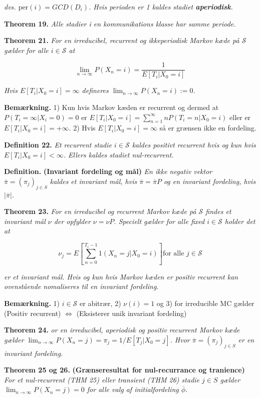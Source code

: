\documentclass[a4paper,12pt,openany]{book}
\begin{document}
\emph{dvs. \(\text{per}(i)=GCD(D_i)\). Hvis perioden er 1 kaldes stadiet \textbf{aperiodisk}.}

\textbf{Theorem 19.} \emph{Alle stadier i en kommunikations klasse har samme periode.}

\textbf{Theorem 21.} \emph{For en irreducibel, recurrent og ikkeperiodisk Markov kæde på \(\mathcal{S}\) gælder for alle \(i\in\mathcal{S}\) at}

\[
\lim_{n\to\infty}P(X_n=i)=\frac{1}{E[T_i \vert X_0=i]}
\]

\emph{Hvis \(E[T_i \vert X_0=i]=\infty\) defineres \(\lim_{n\to\infty}P(X_n=i):=0\).}

\textbf{Bemærkning.} 1) Kun hvis Markov kæden er recurrent og dermed at \(P(T_i=\infty \vert X_i=0)=0\) er \(E[T_i \vert X_0=i]=\sum_{n=1}^\infty nP(T_i=n\vert X_0=i)\) eller er \(E[T_i \vert X_0=i]=+\infty\). 2) Hvis \(E[T_i \vert X_0=i]=\infty\) så er grænsen ikke en fordeling.

\textbf{Definition 22.} \emph{Et recurrent stadie \(i\in\mathcal{S}\) kaldes positivt recurrent hvis og kun hvis \(E[T_i \vert X_0=i]<\infty\). Ellers kaldes stadiet nul-recurrent.}

\textbf{Definition.} \textbf{(Invariant fordeling og mål)} \emph{En ikke negativ vektor \(\overline{\pi}=(\pi_j)_{j\in S}\) kaldes et invariant mål, hvis \(\overline{\pi}=\overline{\pi}P\) og en invariant fordeling, hvis \(\vert\overline{\pi}\vert\).}

\textbf{Theorem 23.} \emph{For en irreducibel og recurrent Markov kæde på \(\mathcal{S}\) findes et invariant mål \(\nu\) der opfylder \(\nu =\nu P\). Specielt gælder for alle fixed \(i\in\mathcal{S}\) holder det at}

\[
\nu_j=E\left[\sum_{n=0}^{T_i-1}1(X_n=j \vert X_0=i)\right] \text{for alle } j\in\mathcal{S}
\]

\emph{er et invariant mål. Hvis og kun hvis Markov kæden er positiv recurrent kan ovenstående nomaliseres til en invariant fordeling.}

\textbf{Bemærkning.} 1) \(i\in\mathcal{S}\) er abitrær, 2) \(\nu(i)=1\) og 3) for irreducible MC gælder (Positiv recurrent) \(\Leftrightarrow\) (Eksisterer unik invariant fordeling)

\textbf{Theorem 24.} \emph{or en irreducibel, aperiodisk og positiv recurrent Markov kæde gælder \(\lim_{n\to\infty}P(X_n=j)=\pi_j=1/E[T_j\vert X_0=j]\). Hvor \(\overline{\pi}=(\pi_j)_{j\in S}\) er en invariant fordeling.}

\textbf{Theorem 25 og 26.} \textbf{(Grænseresultat for nul-recurrance og tranience)} \emph{For et nul-recurrent (THM 25) eller transient (THM 26) stadie \(j\in S\) gælder \(\lim_{n\to\infty}P(X_n=j)=0\) for alle valg af initialfordeling \(\overline{\phi}\).}
\end{document}
